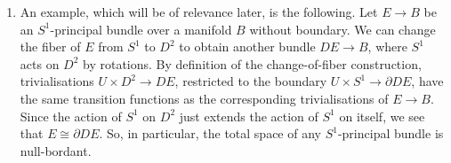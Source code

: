 \begin{example}
\begin{enumerate}[label=(\roman*)]
        \[
        \tau_1^n = \{(L,z) \in \CP^n \times \C^{n+1} \mid z \in L\}.
        \]
        So explicitly
        \[
        U(\tau_1^n) := \{(L,z) \in \tau_1^n \mid \abs{z} = 1\}.
        \]
        Consider the diffeomorphism 
        \[
        U(\tau_1^n) \to S^{2n+1}, \; (L,z) \mapsto z
        \]
        with inverse $S^{2n+1} \to U(\tau_1^n),\; z \mapsto (\pi(z),z)$, where $\pi \colon S^{2n+1} \to \CP^n$ is the canonical projection. Then the restriction of $p$ to $U(\tau_1^n)$ corresponds to $\pi$ under this diffeomorphism. Hence $\pi$ defines an $U(1) \cong S^1$-principal bundle, which agrees with the associated principal bundle of $\tau_1^n \to \CP^n$.
        \item \label{bundles:ex:associated_bundles_part3} An example, which will be of relevance later, is the following. Let $E \to B$ be an $S^1$-principal bundle over a manifold $B$ without boundary. We can change the fiber of $E$ from $S^1$ to $D^2$ to obtain another bundle $DE \to B$, where $S^1$ acts on $D^2$ by rotations. By definition of the change-of-fiber construction, trivialisations $U \times D^2 \to DE$, restricted to the boundary $U \times S^1 \to \partial DE$, have the same transition functions as the corresponding trivialisations of $E \to B$. Since the action of $S^1$ on $D^2$ just extends the action of $S^1$ on itself, we see that $E \cong \partial DE$. So, in particular, the total space of any $S^1$-principal bundle is null-bordant.
    \end{enumerate}
\end{example}







